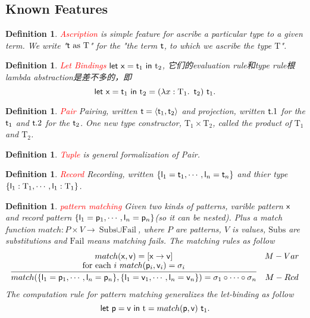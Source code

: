 \documentclass{article}
\theoremstyle{plain}
\newtheorem{definition}[theorem]{Definition}
\theoremstyle{nonumberplain}
\newcommand*{\xfunc}[4]{{#2}\colon{#3}{#1}{#4}}
\newcommand*{\func}[3]{\xfunc{\to}{#1}{#2}{#3}}
\newcommand{\lam}[2]{\ensuremath{\lambda #1\ldotp~ #2}} %
\newcommand{\projone}[1]{\ensuremath{#1.1}}
\newcommand{\projtwo}[1]{\ensuremath{#1.2}}
\newcommand{\singletype}[1]{\text{#1}}
\newcommand{\termtype}[2]{\ensuremath{#1:#2}}
\newcommand{\term}[1]{\ensuremath\mathsf{#1}}
\newcommand{\redt}[1]{\textcolor{red}{#1}}
\begin{document}
\newpage
\subsection{Known Features}

\begin{definition}
\rm \redt{Ascription} is simple feature for ascribe a particular type to a given term. We write "$\term{t}~\text{as}~\singletype{T}$" for the "the term $\term{t}$, to which we ascribe the type $\singletype{T}$".  
\end{definition}

\begin{definition}
\rm \redt{Let Bindings} $\term{let}~ \term{x}=\term{t}_1~\term{in}~\text{t}_2$, 它们的evaluation rule和type rule根lambda abstraction是差不多的，即
$$
\term{let}~ \term{x}=\term{t}_1~\term{in}~\text{t}_2 = (\lam{\termtype{x}{\singletype{T}_1}}{\term{t}_2})~\term{t}_1. 
$$
\end{definition}


\begin{definition}
\rm \redt{Pair} Pairing, written $\term{t}=\left<\term{t}_1,\term{t}_2\right>$ and projection, written $\projone{\term{t}}$ for the $\term{t}_1$ and $\projtwo{\term{t}}$ for the $\term{t}_2$. One new type constructor, $\singletype{T}_1 \times \singletype{T}_2$, called the product of $\singletype{T}_1$ and $\singletype{T}_2$.
\end{definition}

\begin{definition}
\rm \redt{Tuple} is general formalization of Pair.
\end{definition}

\begin{definition}
\rm \redt{Record} Recording, written $\{\term{l}_1 =\term{t}_1, \cdots, \term{l}_n =\term{t}_n\}$ and thier type $\{\termtype{\term{l}_1}{\singletype{T}_1}, \cdots, \termtype{\term{l}_1}{\singletype{T}_1}\}$. 
\end{definition}

\begin{definition}
\rm \redt{pattern matching} Given two kinds of patterns, varible pattern $\term{x}$ and record pattern $\{\term{l}_1 =\term{p}_1, \cdots, \term{l}_n =\term{p}_n\}$(so it can be nested). Plus a match function $\func{match}{P \times V}{\text{Subs} \cup \text{Fail}}$, where $P$ are patterns, $V$ is values, $\text{Subs}$ are substitutions and $\text{Fail}$ means matching fails. The matching rules as follow
$$
\begin{array}{cc}
match(\term{x}, \term{v}) = [\term{x} \to \term{v}] & M-Var \\
\infer{match(\{\term{l}_1 =\term{p}_1, \cdots, \term{l}_n =\term{p}_n\}, \{\term{l}_1 =\term{v}_1, \cdots, \term{l}_n =\term{v}_n\}) = \sigma_1 \circ \cdots \circ \sigma_n}{\text{for each}~i~match(\term{p}_i,\term{v}_i)= \sigma_i}& M-Rcd
\end{array}
$$
The computation rule for pattern matching generalizes the let-binding as follow
$$
\term{let}~ \term{p}=\term{v}~\term{in}~\text{t} = match(\term{p},\term{v})~\term{t}_1. 
$$
\end{definition}
\end{document}
